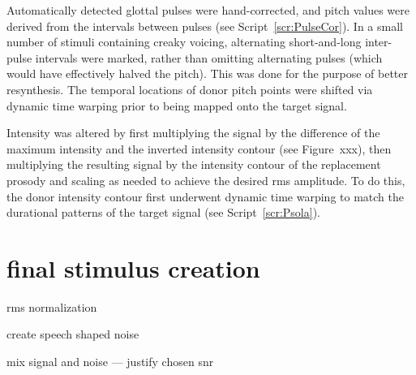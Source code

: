 Automatically detected glottal pulses were hand-corrected, and pitch values were derived from the intervals between pulses (see Script~\ref{scr:PulseCor}).  In a small number of stimuli containing creaky voicing, alternating short-and-long inter-pulse intervals were marked, rather than omitting alternating pulses (which would have effectively halved the pitch).  This was done for the purpose of better resynthesis.  The temporal locations of donor pitch points were shifted via dynamic time warping prior to being mapped onto the target signal.

Intensity was altered by first multiplying the signal by the difference of the maximum intensity and the inverted intensity contour (see Figure~xxx), then multiplying the resulting signal by the intensity contour of the replacement prosody and scaling as needed to achieve the desired \ac{rms} amplitude.  To do this, the donor intensity contour first underwent dynamic time warping to match the durational patterns of the target signal (see Script~\ref{scr:Psola}).

  


\section{final stimulus creation}	
	\begin{itm}
		\item{\ac{rms} normalization}
		\item{create speech shaped noise}
		\item{mix signal and noise — justify chosen \ac{snr}}
	\end{itm}


